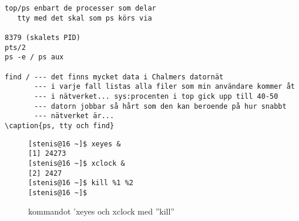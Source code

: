 \documentclass[a4paper]{article}
\begin{document}
\begin{verbatim}
top/ps enbart de processer som delar
   tty med det skal som ps körs via

8379 (skalets PID)
pts/2
ps -e / ps aux

find / --- det finns mycket data i Chalmers datornät
       --- i varje fall listas alla filer som min användare kommer åt
       --- i nätverket... sys:procenten i top gick upp till 40-50
       --- datorn jobbar så hårt som den kan beroende på hur snabbt
       --- nätverket är...
\caption{ps, tty och find}
\end{verbatim}


\begin{figure}
\centering
\begin{verbatim}
[stenis@16 ~]$ xeyes &
[1] 24273 
[stenis@16 ~]$ xclock &
[2] 2427
[stenis@16 ~]$ kill %1 %2
[stenis@16 ~]$ 
\end{verbatim}
\caption{kommandot 'xeyes och xclock med ''kill''}
\end{figure}
\end{document}
